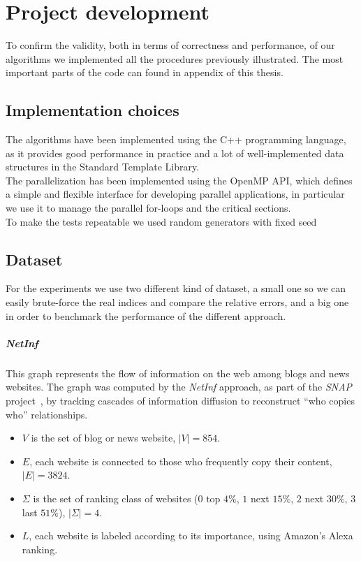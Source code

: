 
\chapter{Project development}
    
    To confirm the validity, both in terms of correctness and performance, of our algorithms we implemented all the procedures previously illustrated. 
    The most important parts of the code can found in appendix of this thesis.
    
    \section{Implementation choices}
    
    The algorithms have been implemented using the C++ programming language, 
    as it provides good performance in practice and a lot of well-implemented data structures in the Standard Template Library.\\
    
    The parallelization has been implemented using the OpenMP API, which defines a simple and flexible interface for developing parallel applications, in particular we use it to manage the parallel for-loops and the critical sections.\\
    
    To make the tests repeatable we used random generators with fixed seed
    
    \clearpage
    \section{Dataset}
    
    For the experiments we use two different kind of dataset, a small one so we can easily brute-force the real indices and compare the relative errors, and a big one in order to benchmark the performance of the different approach.
    
    \paragraph*{NetInf} This graph represents the flow of information on the web among blogs and news websites. The graph was computed by the \textit{NetInf} approach, as part of the \textit{SNAP} project~\cite{netinf}, by tracking cascades of information diffusion to reconstruct ``who copies who'' relationships.
    
    \begin{itemize}
    	\item $V$ is the set of blog or news website, $|V| = 854$.
    	\item $E$, each website is connected to those who frequently copy their content, $|E| = 3824$.
    	\item $\Sigma$ is the set of ranking class of websites ($0$ top $4\%$, $1$ next $15\%$, $2$ next $30\%$, $3$ last $51\%$), $|\Sigma| = 4$.
    	\item $L$, each website is labeled according to its importance, using Amazon's Alexa ranking.
    \end{itemize}

